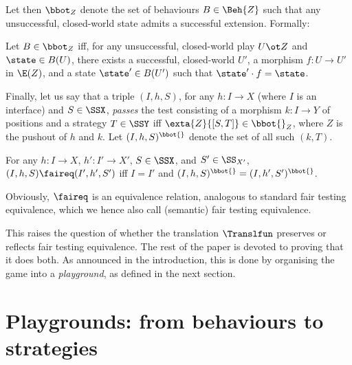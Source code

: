 \documentclass{LMCS}
\theoremstyle{plain}\newtheorem{satz}[thm]{Satz}
\begin{document}
Let then $\bbot_Z$ denote the set of behaviours $B \in
\Beh{Z}$ such that any unsuccessful, closed-world state admits a
successful extension.  Formally:
\begin{defi}\label{def:bbotccs}
  Let $B \in \bbot_Z$ iff, for any unsuccessful, closed-world play $U
  \ot Z$ and $\state \in B (U)$, there exists a successful,
  closed-world $U'$, a morphism $f \colon U \to U'$ in $\E(Z)$, and a state
  $\state' \in B (U')$ such that $\state' \cdot f = \state$.
\end{defi}
Finally, let us say
that a triple $(I,h,S)$, for any $h \colon I \to X$ (where $I$ is an
interface) and $S \in \SSX$, \emph{passes} the test
consisting of a morphism $k \colon I \to Y$ of positions and a
strategy $T \in \SSY$ iff $\exta{Z}{[S,T]} \in \bbot{}_Z$, where $Z$
is the pushout of $h$ and $k$.  Let $(I,h,S)^{\bbot{}}$ denote the set of
all such $(k,T)$.
\begin{defi}
  For any $h \colon I \to X$, $h' \colon I' \to X'$, $S \in \SSX$, and
  $S' \in \SS_{X'}$, $(I,h,S) \faireq (I',h',S')$ iff $I = I'$ and
  $(I,h,S)^{\bbot{}} = (I,h',S')^{\bbot{}}$.
\end{defi}
Obviously, $\faireq$ is an equivalence relation, analogous to standard fair
testing equivalence, which we hence also call (semantic) fair testing
equivalence.

This raises the question of whether the translation $\Translfun$
preserves or reflects fair testing equivalence. The rest of the paper
is devoted to proving that it does both. As announced in the
introduction, this is done by organising the game into a
\emph{playground}, as defined in the next section.

\section{Playgrounds: from behaviours to strategies}\label{sec:playgrounds}
\end{document}
